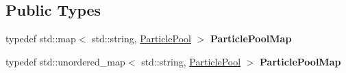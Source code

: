 \subsection*{Public Types}
\begin{DoxyCompactItemize}
\item 
\mbox{\label{classPUParticleSystem3D_ae629eddf38c18173494e204a4a0ae51b}} 
typedef std\+::map$<$ std\+::string, \hyperlink{classDataPool}{Particle\+Pool} $>$ {\bfseries Particle\+Pool\+Map}
\item 
\mbox{\label{classPUParticleSystem3D_ab2674ea9427fd82b51746a79921f0e4d}} 
typedef std\+::unordered\+\_\+map$<$ std\+::string, \hyperlink{classDataPool}{Particle\+Pool} $>$ {\bfseries Particle\+Pool\+Map}
\end{DoxyCompactItemize}
